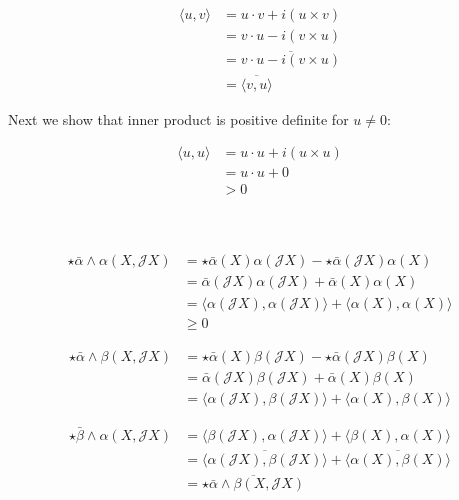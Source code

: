 \documentclass{article}
\def\cJ{\mathcal{J}}
\begin{document}
\begin{align*}
    \langle u, v \rangle &= u \cdot v + i (u \times v) \\
        &= v \cdot u - i (v \times u) \\
        &= \overline{v \cdot u - i (v \times u)} \\
        &= \overline{\langle v, u \rangle}
\end{align*}

Next we show that inner product is positive definite for $u \ne 0$:

\begin{align*}
    \langle u, u \rangle &= u \cdot u + i (u \times u) \\
        &= u \cdot u + 0 \\
        &> 0
\end{align*}


\vspace{1.8cm}
\\\\


\begin{align*}
    \star \bar{\alpha} \wedge \alpha (X, \cJ X) &= \star \bar{\alpha}(X) \alpha(\cJ X) - \star \bar{\alpha}(\cJ X) \alpha(X) \\
        &= \bar{\alpha}(\cJ X) \alpha(\cJ X) + \bar{\alpha}(X) \alpha(X) \\
        &= \langle \alpha(\cJ X), \alpha(\cJ X) \rangle + \langle \alpha(X), \alpha(X) \rangle \\
        &\ge 0
\end{align*}

\begin{align*}
    \star \bar{\alpha} \wedge \beta (X, \cJ X) &= \star \bar{\alpha}(X) \beta(\cJ X) - \star \bar{\alpha}(\cJ X) \beta(X) \\
        &= \bar{\alpha}(\cJ X) \beta(\cJ X) + \bar{\alpha}(X) \beta(X) \\
        &= \langle \alpha(\cJ X), \beta(\cJ X) \rangle + \langle \alpha(X), \beta(X) \rangle
\end{align*}

\begin{align*}
    \star \bar{\beta} \wedge \alpha (X, \cJ X) &= \langle \beta(\cJ X), \alpha(\cJ X) \rangle + \langle \beta(X), \alpha(X) \rangle \\
        &= \overline{\langle \alpha(\cJ X), \beta(\cJ X) \rangle} + \overline{\langle \alpha(X), \beta(X) \rangle} \\
        &= \overline{\star \bar{\alpha} \wedge \beta (X, \cJ X)}
\end{align*}
\end{document}
